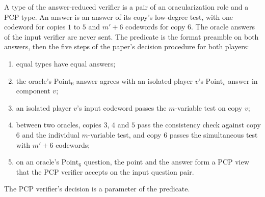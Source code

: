 \begin{definition}
\label{def:ar-decider-predicate}
\leanok
A type of the answer-reduced verifier is a pair of an oracularization role and a PCP type. An
answer is an answer of its copy's low-degree test, with one codeword for copies $1$ to $5$ and
$m'+6$ codewords for copy $6$. The oracle answers of the input verifier are never sent. The
predicate is the format preamble on both answers, then the five steps of the paper's decision
procedure for both players:
\begin{enumerate}
\item equal types have equal answers;
\item the oracle's $\mathrm{Point}_6$ answer agrees with an isolated player $v$'s
  $\mathrm{Point}_v$ answer in component $v$;
\item an isolated player $v$'s input codeword passes the $m$-variable test on copy $v$;
\item between two oracles, copies $3$, $4$ and $5$ pass the consistency check against copy $6$
  and the individual $m$-variable test, and copy $6$ passes the simultaneous test with $m'+6$
  codewords;
\item on an oracle's $\mathrm{Point}_6$ question, the point and the answer form a PCP view that
  the PCP verifier accepts on the input question pair.
\end{enumerate}
The PCP verifier's decision is a parameter of the predicate.
\end{definition}

